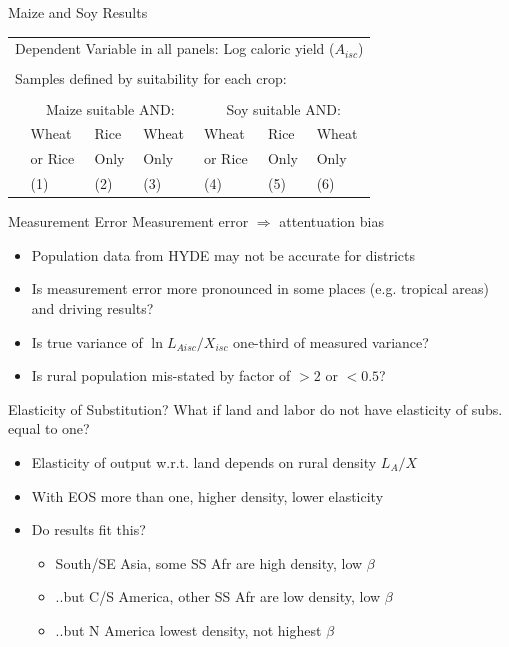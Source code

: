 \documentclass[10pt, xcolor=dvipsnames]{beamer}
\begin{document}
\begin{frame}{Maize and Soy Results}\label{othercrop}

{\footnotesize
\begin{tabularx}{\textwidth}{lXXXXXX}
\midrule
\multicolumn{7}{l}{Dependent Variable in all panels: Log caloric yield ($A_{isc}$)} \\ \\
\multicolumn{7}{l}{Samples defined by suitability for each crop:} \\ \\
 & \multicolumn{3}{c}{Maize suitable AND:} & \multicolumn{3}{c}{Soy suitable AND:} \\ \cmidrule(lr){2-4} \cmidrule(lr){5-7}
 & Wheat & Rice & Wheat  & Wheat  & Rice  & Wheat \\
 & or Rice & Only & Only & or Rice & Only & Only   \\
 & (1) & (2) & (3) & (4) & (5) & (6) \\
\midrule

\midrule
\end{tabularx}
}

\hfill \hyperlink{robustness}{}
\end{frame}

\begin{frame}{Measurement Error}\label{measure}
Measurement error $\Rightarrow$ attentuation bias
\begin{itemize}
  \item Population data from HYDE may not be accurate for districts
  \item Is measurement error more pronounced in some places (e.g. tropical areas) and driving results?
  \item Is true variance of $\ln L_{Aisc}/X_{isc}$ one-third of measured variance?
  \item Is rural population mis-stated by factor of $>2$ or $<0.5$?
\end{itemize}

\hfill \hyperlink{robustness}{}
\end{frame}

\begin{frame}{Elasticity of Substitution?}\label{eos}
What if land and labor do not have elasticity of subs. equal to one?
\begin{itemize}
  \item Elasticity of output w.r.t. land depends on rural density $L_A/X$
  \item With EOS more than one, higher density, lower elasticity
  \item Do results fit this?
  \begin{itemize}
    \item South/SE Asia, some SS Afr are high density, low $\beta$
    \item ..but C/S America, other SS Afr are low density, low $\beta$
    \item ..but N America lowest density, not highest $\beta$
  \end{itemize}
\end{itemize}
\hfill \hyperlink{rurdbeta}{}
\hfill \hyperlink{robustness}{}
\end{frame}
\end{document}
